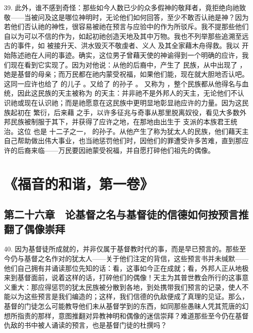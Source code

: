 39. 此外，谁不感到奇怪：那些如今人数已少的众多假神的敬拜者，竟拒绝向祂致敬——当被问及这是哪位神明时，无论他们如何回答，至少不敢否认祂是神？因为若他们否认祂的神性，很容易被祂在预言与应验中的作为所驳斥。我不提那些他们自以为可以不信的作为，如起初祂创造天地及其中万物。我也不列举那些追溯至远古的事件，如  被接升天、洪水毁灭不敬虔者、义人  及其全家藉木舟得救。我以  开始陈述祂在人间的事迹。确实，这位男子曾藉天使的神谕得到一个明确的应许，我们现在看到它实现了。因为对他说：从他的后裔中，产生了  民族，从中出现了 ，她是基督的母亲；而万民都在祂内蒙受祝福，如果他们能，现在就大胆地否认吧。这同一应许也给了  的儿子 。又给了  的孙子 。 又称为 ，整个民族都从他得名与血统，因此这民族的天主被称为  的天主：并非祂不是外邦人的天主，无论他们不认识祂或现在认识祂；而是祂愿意在这民族中更明显地彰显祂应许的力量。因为这民族起初在  繁衍，后来藉  之手，以许多征兆与奇事从那里脱离奴役，看见大多数外邦民族被制服于其下，并获得了应许之地，在那地由出生于  支派的本族君王统治。这位  也是  十二子之一， 的孙子。从他产生了称为犹太人的民族，他们藉天主自己帮助做出伟大事业，也当祂惩罚他们时，因他们的罪遭受许多苦难，直到那应许的后裔来临——万民要因祂蒙受祝福，并自愿打碎他们祖先的偶像。\par



\section{《福音的和谐，第一卷》}


\subsection{第二十六章　论基督之名与基督徒的信德如何按预言推翻了偶像崇拜}

40. 因为基督徒所成就的，并非仅属于基督教时代的事，而是早已预言的。那些至今仍与基督之名作对的犹太人——关于他们注定的背信，这些预言书并未缄默——他们自己拥有并诵读那位先知的话：看，这事如今正在成就；看，外邦人正从地极来到基督面前，说着这样的话，打碎他们的偶像！天主为其普世教会所行的这事意义重大：那应得惩罚的犹太民族被分散到各地，到处携带我们预言的记录，使人不能以为这些预言是我们编造的；这样，我们信德的仇敌便成了真理的见证。那么，基督的门徒怎么可能教导他们未从基督学到的东西，如同那些愚昧人凭其荒唐的幻想所指责的那样，意图推翻对异教神明和偶像的迷信崇拜？难道那些至今仍在基督仇敌的书中被人诵读的预言，也是基督门徒的杜撰吗？\par

